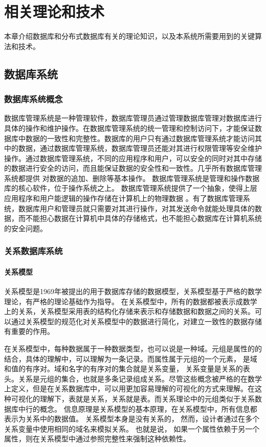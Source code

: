 
\chapter{相关理论和技术}
本章介绍数据库和分布式数据库有关的理论知识，以及本系统所需要用到的关键算法和技术。
\section{数据库系统}
\subsection{数据库系统概念}
数据库管理系统是一种管理软件，数据库管理员通过管理数据库管理对数据库进行具体的操作和维护操作。在数据库管理系统的统一管理和控制访问下，才能保证数据库中数据的一致性和完整性。数据库的用户只有通过数据库管理系统才能访问其中的数据，通过数据库管理系统，数据库管理员还能对其进行权限管理等安全维护操作。通过数据库管理系统，不同的应用程序和用户，可以安全的同时对其中存储的数据进行安全的访问，而且能保证数据的安全性和一致性。几乎所有数据库管理系统都提供
对数据的追加、删除等基本操作。
数据库管理系统是管理和操作数据库的核心软件，位于操作系统之上。
数据库管理系统提供了一个抽象，使得上层应用程序和用户能逻辑的操作存储在计算机上的物理数据
。有了数据库管理系统，数据库用户和管理员就只需要对其进行操作，对其发送命令就能处理具体的数据，而不能担心数据在计算机中具体的存储格式，也不能担心数据库在计算机系统的安全问题。
\subsection{关系数据库系统}
\subsubsection{关系模型}
关系模型是1969年被提出的用于数据库存储的数据模型，关系模型基于严格的数学理论，有严格的理论基础作为指导。
在关系模型中，所有的数据都被表示成数学上的关系，关系模型采用表的结构化存储来表示和存储数据和数据之间的关系。可以通过关系模型的规范化对关系模型中的数据进行简化，对建立一致性的数据存储有重要的作用。

在关系模型中，每种数据属于一种数据类型，也可以说是一种域。元组是属性的的结合，具体的理解中，可以理解为一条记录。而属性属于元组的一个元素，
是域和值的有序对。域和名字的有序对的集合就是关系变量，
关系变量是关系的表头。关系是元组的集合，也就是多条记录组成关系。尽管这些概念被严格的在数学上定义，但是在关系数据库中，可以用更加容易理解的可视化的方式来理解。在这种可视化的理解下，表就是关系，关系就是表。而关系理论中的元组类似于关系数据库中行的概念。
信息原理是关系模型的基本原理，在关系模型中，所有信息都表示为关系中的数据值。
关系模型本身是没有关系的，
然而，设计者通过在多个关系变量中使用相同的域名来模拟关系。
也就是说，
如果一个属性依赖于另一个属性，则在关系模型中通过参照完整性来强制这种依赖性。

